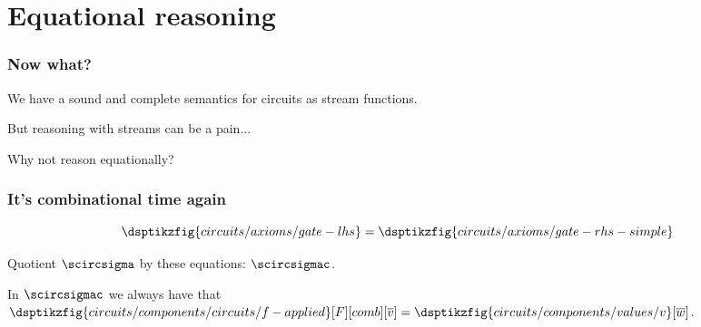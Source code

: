 \section{Equational reasoning}

\begin{frame}
    \frametitle{Now what?}

    We have a \alert{sound and complete} semantics for circuits as
    \alert{stream functions}.

    \wait

    But reasoning with streams can be a \alert{pain}...

    \wait
    Why not reason \alert{equationally}?
\end{frame}

\begin{frame}
    \frametitle{It's combinational time again}

    \begin{minipage}{0.49\textwidth}
        \begin{equation*}
            \dsptikzfig{circuits/axioms/gate-lhs}
            =
            \dsptikzfig{circuits/axioms/gate-rhs-simple}
        \end{equation*}

    \end{minipage}
    \begin{minipage}{0.49\textwidth}

    \end{minipage}

    \Large
    Quotient \(\scircsigma\) by these equations: \(\scircsigmac\).

    \wait
    In \(\scircsigmac\) we always have that \(
        \dsptikzfig{circuits/components/circuits/f-applied}[F][comb][\overline{v}]
        =
        \dsptikzfig{circuits/components/values/v}[\overline{w}]
    \).



\end{frame}
